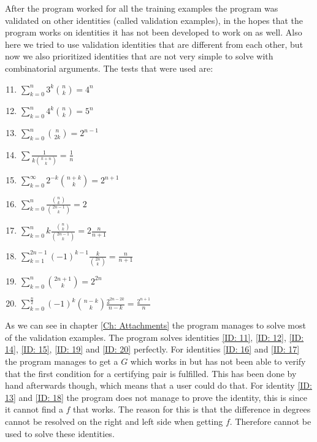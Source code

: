 After the program worked for all the training examples the program was validated on other identities (called validation examples), in the hopes that the program works on identities it has not been developed to work on as well. Also here we tried to use validation identities that are different from each other, but now we also prioritized identities that are not very simple to solve with combinatorial arguments. The tests that were used are:
\begin{enumerate}
  \setcounter{enumi}{10}
  \item $\sum_{k=0}^n 3^k\binom{n}{k} = 4^n$ \label{ID: 11}
  \item $\sum_{k=0}^n 4^k\binom{n}{k} = 5^n$ \label{ID: 12}
  \item $\sum_{k=0}^n \binom{n}{2k} = 2^{n-1}$ \label{ID: 13}
  \item $\sum \frac{1}{k\binom{k+n}{k}} = \frac{1}{n}$ \label{ID: 14}
  \item $\sum_{k=0}^\infty 2^{-k}\binom{n+k}{k} = 2^{n+1}$ \label{ID: 15}
  \item $\sum_{k=0}^n \frac{\binom{n}{k}}{\binom{2n-1}{k}} = 2$ \label{ID: 16}
  \item $\sum_{k=0}^n k\frac{\binom{n}{k}}{\binom{2n-1}{k}} = 2\frac{n}{n+1}$ \label{ID: 17}
  \item $\sum_{k=1}^{2n-1} (-1)^{k-1}\frac{k}{\binom{2n}{k}} = \frac{n}{n+1}$ \label{ID: 18}
  \item $\sum_{k=0}^n \binom{2n+1}{k} = 2^{2n}$ \label{ID: 19}
  \item $\sum_{k=0}^{\frac{n}{2}} (-1)^k\binom{n-k}{k}\frac{2^{2n-2k}}{n-k} = \frac{2^{n+1}}{n}$ \label{ID: 20}
\end{enumerate}
As we can see in chapter \ref{Ch: Attachments} the program manages to solve most of the validation examples. The program solves identities \ref{ID: 11}, \ref{ID: 12}, \ref{ID: 14}, \ref{ID: 15}, \ref{ID: 19} and \ref{ID: 20} perfectly. For identities \ref{ID: 16} and \ref{ID: 17} the program manages to get a $G$ which works in \WZ but has not been able to verify that the first condition for a certifying pair is fulfilled. This has been done by hand afterwards though, which means that a user could do that. For identity \ref{ID: 13} and \ref{ID: 18} the program does not manage to prove the identity, this is since it cannot find a $f$ that works. The reason for this is that the difference in degrees cannot be resolved on the right and left side when getting $f$. Therefore \WZ cannot be used to solve these identities.
